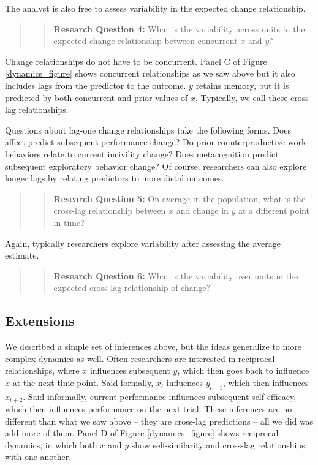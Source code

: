 \documentclass[english,,man]{apa6}
\theoremstyle{definition}
\theoremstyle{definition}
\theoremstyle{definition}
\theoremstyle{remark}
\begin{document}
The analyst is also free to assess variability in the expected change
relationship.

\begin{quote}
\begin{quote}
\textbf{Research Question 4:} What is the variability across units in
the expected change relationship between concurrent \(x\) and \(y\)?
\end{quote}
\end{quote}

Change relationships do not have to be concurrent. Panel C of Figure
\ref{dynamics_figure} shows concurrent relationships as we saw above but
it also includes lags from the predictor to the outcome. \(y\) retains
memory, but it is predicted by both concurrent and prior values of
\(x\). Typically, we call these cross-lag relationships.

Questions about lag-one change relationships take the following forms.
Does affect predict subsequent performance change? Do prior
counterproductive work behaviors relate to current incivility change?
Does metacognition predict subsequent exploratory behavior change? Of
course, researchers can also explore longer lags by relating predictors
to more distal outcomes.

\begin{quote}
\begin{quote}
\textbf{Research Question 5:} On average in the population, what is the
cross-lag relationship between \(x\) and change in \(y\) at a different
point in time?
\end{quote}
\end{quote}

Again, typically researchers explore variability after assessing the
average estimate.

\begin{quote}
\begin{quote}
\textbf{Research Question 6:} What is the variability over units in the
expected cross-lag relationship of change?
\end{quote}
\end{quote}

\hypertarget{extensions}{%
\subsection{Extensions}\label{extensions}}

We described a simple set of inferences above, but the ideas generalize
to more complex dynamics as well. Often researchers are interested in
reciprocal relationships, where \(x\) influences subsequent \(y\), which
then goes back to influence \(x\) at the next time point. Said formally,
\(x_t\) influences \(y_{t+1}\), which then influences \(x_{t+2}\). Said
informally, current performance influences subsequent self-efficacy,
which then influences performance on the next trial. These inferences
are no different than what we saw above -- they are cross-lag
predictions -- all we did was add more of them. Panel D of Figure
\ref{dynamics_figure} shows reciprocal dynamics, in which both \(x\) and
\(y\) show self-similarity and cross-lag relationships with one another.
\end{document}
